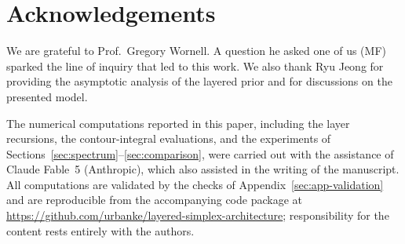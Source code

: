 \documentclass[11pt]{article}
\begin{document}
\section*{Acknowledgements}
 
We are grateful to Prof.\ Gregory Wornell. A question he asked one of us (MF) sparked the line of inquiry that led to this work. We also thank Ryu Jeong for providing
the asymptotic analysis of the layered prior \cite{jeong2026phase} and for discussions on the presented model.
 
The numerical computations reported in this paper, including the layer
recursions, the contour-integral evaluations, and the experiments of
Sections~\ref{sec:spectrum}--\ref{sec:comparison}, were carried out with
the assistance of Claude Fable~5 (Anthropic), which also assisted in the
writing of the manuscript.  All computations are validated by the checks
of Appendix~\ref{sec:app-validation} and are reproducible from the accompanying code package at
\url{https://github.com/urbanke/layered-simplex-architecture}; responsibility for the content rests entirely
with the authors.


\begingroup
\small


\endgroup
\end{document}
